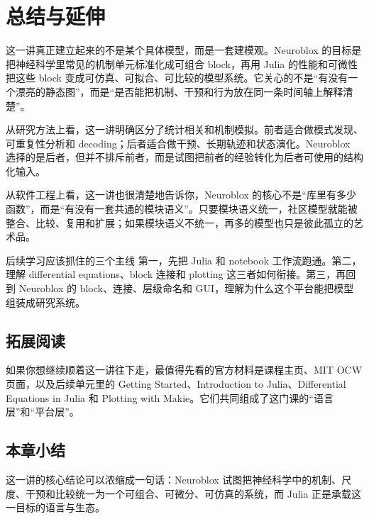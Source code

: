 \documentclass[a4paper]{article}
\begin{document}
\section{总结与延伸}
这一讲真正建立起来的不是某个具体模型，而是一套建模观。Neuroblox 的目标是把神经科学里常见的机制单元标准化成可组合 block，再用 Julia 的性能和可微性把这些 block 变成可仿真、可拟合、可比较的模型系统。它关心的不是“有没有一个漂亮的静态图”，而是“是否能把机制、干预和行为放在同一条时间轴上解释清楚”。

从研究方法上看，这一讲明确区分了统计相关和机制模拟。前者适合做模式发现、可重复性分析和 decoding；后者适合做干预、长期轨迹和状态演化。Neuroblox 选择的是后者，但并不排斥前者，而是试图把前者的经验转化为后者可使用的结构化输入。

从软件工程上看，这一讲也很清楚地告诉你，Neuroblox 的核心不是“库里有多少函数”，而是“有没有一套共通的模块语义”。只要模块语义统一，社区模型就能被整合、比较、复用和扩展；如果模块语义不统一，再多的模型也只是彼此孤立的艺术品。

\begin{importantbox}{后续学习应该抓住的三个主线}
第一，先把 Julia 和 notebook 工作流跑通。第二，理解 differential equations、block 连接和 plotting 这三者如何衔接。第三，再回到 Neuroblox 的 block、连接、层级命名和 GUI，理解为什么这个平台能把模型组装成研究系统。
\end{importantbox}

\subsection{拓展阅读}
如果你想继续顺着这一讲往下走，最值得先看的官方材料是课程主页、MIT OCW 页面，以及后续单元里的 Getting Started、Introduction to Julia、Differential Equations in Julia 和 Plotting with Makie。它们共同组成了这门课的“语言层”和“平台层”。

\subsection{本章小结}
这一讲的核心结论可以浓缩成一句话：Neuroblox 试图把神经科学中的机制、尺度、干预和比较统一为一个可组合、可微分、可仿真的系统，而 Julia 正是承载这一目标的语言与生态。
\end{document}
